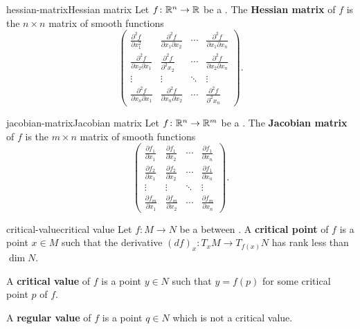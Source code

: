 \begin{topic}{hessian-matrix}{Hessian matrix}
    Let $f \colon \mathbb{R}^n \to \mathbb{R}$ be a . The \textbf{Hessian matrix} of $f$ is the $n \times n$ matrix of smooth functions
    \[ \begin{pmatrix}
        \frac{\partial^2 f}{\partial x_1^2} & \frac{\partial^2 f}{\partial x_1 \partial x_2} & \cdots & \frac{\partial^2 f}{\partial x_1 \partial x_n} \\
        \frac{\partial^2 f}{\partial x_2 \partial x_1} & \frac{\partial^2 f}{\partial^2 x_2} & \cdots & \frac{\partial^2 f}{\partial x_2 \partial x_n} \\
        \vdots & \vdots & \ddots & \vdots \\
        \frac{\partial^2 f}{\partial x_n \partial x_1} & \frac{\partial^2 f}{\partial x_n \partial x_2} & \cdots & \frac{\partial^2 f}{\partial^2 x_n}
    \end{pmatrix} . \]
\end{topic}

\begin{topic}{jacobian-matrix}{Jacobian matrix}
    Let $f \colon \mathbb{R}^n \to \mathbb{R}^m$ be a . The \textbf{Jacobian matrix} of $f$ is the $m \times n$ matrix of smooth functions
    \[ \begin{pmatrix}
        \frac{\partial f_1}{\partial x_1} & \frac{\partial f_1}{\partial x_2} & \cdots & \frac{\partial f_1}{\partial x_n} \\
        \frac{\partial f_2}{\partial x_1} & \frac{\partial f_2}{\partial x_2} & \cdots & \frac{\partial f_1}{\partial x_n} \\
        \vdots & \vdots & \ddots & \vdots \\
        \frac{\partial f_m}{\partial x_1} & \frac{\partial f_m}{\partial x_2} & \cdots & \frac{\partial f_m}{\partial x_n}
    \end{pmatrix} . \]
\end{topic}

\begin{topic}{critical-value}{critical value}
    Let $f \colon M \to N$ be a  between . A \textbf{critical point} of $f$ is a point $x \in M$ such that the derivative $(df)_x \colon T_x M \to T_{f(x)} N$ has rank less than $\dim N$.
    
    A \textbf{critical value} of $f$ is a point $y \in N$ such that $y =  f(p)$ for some critical point $p$ of $f$.
    
    A \textbf{regular value} of $f$ is a point $q \in N$ which is not a critical value.
\end{topic}


